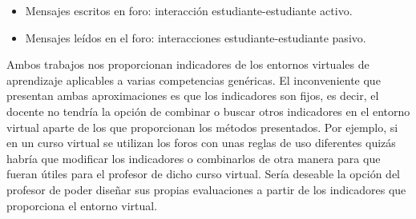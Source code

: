\begin{itemize}
\item Mensajes escritos en foro: interacción estudiante-estudiante activo.
\item Mensajes leídos en el foro:  interacciones estudiante-estudiante pasivo.
\end{itemize}

Ambos trabajos nos proporcionan indicadores de los entornos virtuales de aprendizaje aplicables a varias competencias genéricas. El inconveniente que presentan ambas aproximaciones es que los indicadores son fijos, es decir, el docente no tendría la opción de combinar o buscar otros indicadores en el entorno virtual aparte de los que proporcionan los métodos presentados. Por ejemplo, si en un curso virtual se utilizan los foros con unas reglas de uso diferentes quizás habría que modificar los indicadores o combinarlos de otra manera para que fueran útiles para el profesor de dicho curso virtual. Sería deseable la opción del profesor de poder diseñar sus propias evaluaciones a partir de los indicadores que proporciona el entorno virtual.

